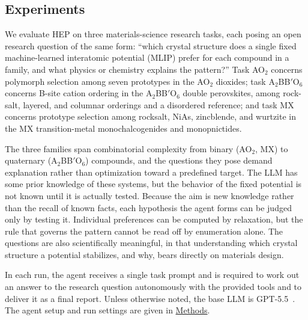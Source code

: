 \subsection{Experiments}
We evaluate HEP on three materials-science research tasks, each posing
an open research question of the same form: ``which crystal structure
does a single fixed machine-learned interatomic potential (MLIP) prefer
for each compound in a family, and what physics or chemistry explains
the pattern?''
Task AO$_2$ concerns polymorph selection among seven prototypes in the
AO$_2$ dioxides; task A$_2$BB$'$O$_6$ concerns B-site cation ordering
in the A$_2$BB$'$O$_6$ double perovskites, among rock-salt, layered,
and columnar orderings and a disordered reference; and task MX
concerns prototype selection among rocksalt, NiAs, zincblende, and
wurtzite in the MX transition-metal monochalcogenides and
monopnictides.

The three families span combinatorial complexity from binary (AO$_2$,
MX) to quaternary (A$_2$BB$'$O$_6$) compounds, and the questions they
pose demand explanation rather than optimization toward a predefined
target.
The LLM has some prior knowledge of these systems, but the behavior
of the fixed potential is not known until it is actually tested.
Because the aim is new knowledge rather than the recall of known
facts, each hypothesis the agent forms can be judged only by testing
it.
Individual preferences can be computed by relaxation, but the rule
that governs the pattern cannot be read off by enumeration alone.
The questions are also scientifically meaningful, in that
understanding which crystal structure a potential stabilizes, and why,
bears directly on materials design.

In each run, the agent receives a single task prompt and is required
to work out an answer to the research question autonomously with the
provided tools and to deliver it as a final report.
Unless otherwise noted, the base LLM is GPT-5.5~\cite{OpenAI2026GPT55}.
The agent setup and
run settings are given in \hyperref[sec:methods]{Methods}.

